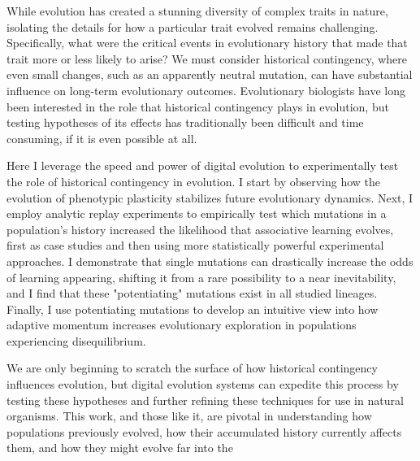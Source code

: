 While evolution has created a stunning diversity of complex traits in nature, isolating the details for how a particular trait evolved remains challenging.
Specifically, what were the critical events in evolutionary history that made that trait more or less likely to arise?
We must consider historical contingency, where even small changes, such as an apparently neutral mutation, can have substantial influence on long-term evolutionary outcomes. 
Evolutionary biologists have long been interested in the role that historical contingency plays in evolution, but testing hypotheses of its effects has traditionally been difficult and time consuming, if it is even possible at all. 

Here I leverage the speed and power of digital evolution to experimentally test the role of historical contingency in evolution. 
I start by observing how the evolution of phenotypic plasticity stabilizes future evolutionary dynamics. 
Next, I employ analytic replay experiments to empirically test which mutations in a population's history increased the likelihood that associative learning evolves, first as case studies and then using more statistically powerful experimental approaches. 
I demonstrate that single mutations can drastically increase the odds of learning appearing, shifting it from a rare possibility to a near inevitability, and I find that these "potentiating" mutations exist in all studied lineages. 
Finally, I use potentiating mutations to develop an intuitive view into how adaptive momentum increases evolutionary exploration in populations experiencing disequilibrium. 

We are only beginning to scratch the surface of how historical contingency influences evolution, but digital evolution systems can expedite this process by testing these hypotheses and further refining these techniques for use in natural organisms. 
This work, and those like it, are pivotal in understanding how populations previously evolved, how their accumulated history currently affects them, and how they might evolve far into the 